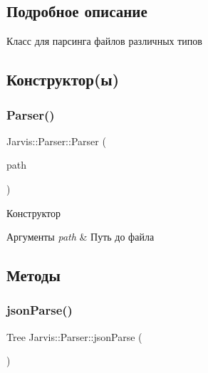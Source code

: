 \subsection{Подробное описание}
Класс для парсинга файлов различных типов 

\subsection{Конструктор(ы)}
\mbox{\label{classJarvis_1_1Parser_ac4987517b9f2618f1c8a7ff8a91f6b77}} 
\subsubsection{\texorpdfstring{Parser()}{Parser()}}
{\footnotesize\ttfamily Jarvis\+::\+Parser\+::\+Parser (\begin{DoxyParamCaption}\item[{const Path \&}]{path }\end{DoxyParamCaption})\hspace{0.3cm}{\ttfamily [explicit]}}



Конструктор 


\begin{DoxyParams}{Аргументы}
{\em path} & Путь до файла \\
\hline
\end{DoxyParams}


\subsection{Методы}
\mbox{\label{classJarvis_1_1Parser_a6d9a642092d5b7806b19ea6ccd98a515}} 
\subsubsection{\texorpdfstring{json\+Parse()}{jsonParse()}}
{\footnotesize\ttfamily Tree Jarvis\+::\+Parser\+::json\+Parse (\begin{DoxyParamCaption}{ }\end{DoxyParamCaption})}



